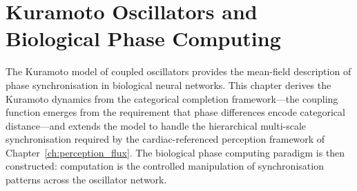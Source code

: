 \chapter{Kuramoto Oscillators and Biological Phase Computing}
\label{ch:kuramoto}


\begin{chapterabstract}
The Kuramoto model of coupled oscillators provides the mean-field description of phase synchronisation in biological neural networks. This chapter derives the Kuramoto dynamics from the categorical completion framework---the coupling function emerges from the requirement that phase differences encode categorical distance---and extends the model to handle the hierarchical multi-scale synchronisation required by the cardiac-referenced perception framework of Chapter~\ref{ch:perception_flux}. The biological phase computing paradigm is then constructed: computation is the controlled manipulation of synchronisation patterns across the oscillator network.
\end{chapterabstract}


